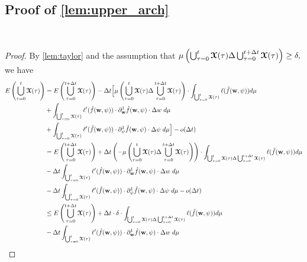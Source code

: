 \subsection{Proof of \cref{lem:upper_arch}}~\label{sec:upper_arch}
\begin{proof}
    By \cref{lem:taylor} and the assumption that $\mu\left( \bigcup_{\tau = 0}^{t}\boldsymbol{\mathcal{X}}(\tau)\Delta \bigcup_{\tau = 0}^{t+\Delta t}\boldsymbol{\mathcal{X}}(\tau)\right)\geq \delta,$ we have
    \begin{align*}
       E\left(\bigcup_{\tau = 0}^{t}\tx(\tau)\right) & = E\left(\bigcup_{\tau = 0}^{t+\Delta t}\tx(\tau)\right) - \Delta t\Big[\mu\left( \bigcup_{\tau = 0}^{t}\tx(\tau)\Delta \bigcup_{\tau = 0}^{t+\Delta t}\tx(\tau)\right)\cdot \displaystyle\int_{\bigcup_{\tau = 0}^{t}\tx(\tau)} \ell(\hat{f}(\weight,\psi))d\mu\\
        & +\displaystyle\int_{\bigcup_{\tau = 0}^{t}\tx(\tau)} \ell'(\hat{f}(\weight,\psi))\cdot \partial_{\weight}^1 \hat{f}(\weight,\psi)\cdot \Delta w \hspace{1mm}  d\mu\\
        & +\displaystyle\int_{\bigcup_{\tau = 0}^{t}\tx(\tau)} \ell'(\hat{f}(\weight,\psi))\cdot \partial_{\psi}^1 \hat{f}(\weight,\psi)\cdot \Delta \psi \hspace{1mm}  d\mu\Big]- o(\Delta t)\\
        & = E\left(\bigcup_{\tau = 0}^{t+\Delta t}\tx(\tau)\right) + \Delta t\left(-\mu\left( \bigcup_{\tau = 0}^{t}\tx(\tau)\Delta \bigcup_{\tau = 0}^{t+\Delta t}\tx(\tau)\right)\right)\cdot \displaystyle\int_{\bigcup_{\tau = 0}^{t}\tx(\tau)\Delta \bigcup_{\tau = 0}^{t+\Delta t}\tx(\tau)} \ell(\hat{f}(\weight,\psi))d\mu\\
        & - \Delta t\displaystyle\int_{\bigcup_{\tau = 0}^{t}\tx(\tau)} \ell'(\hat{f}(\weight,\psi))\cdot \partial_{\weight}^1 \hat{f}(\weight,\psi)\cdot \Delta w \hspace{1mm}  d\mu\\
        &-\Delta t \displaystyle\int_{\bigcup_{\tau = 0}^{t}\tx(\tau)} \ell'(\hat{f}(\weight,\psi))\cdot \partial_{\psi}^1 \hat{f}(\weight,\psi)\cdot \Delta \psi \hspace{1mm}  d\mu- o(\Delta t)\\
        & \leq E\left(\bigcup_{\tau = 0}^{t+\Delta t}\tx(\tau)\right) + \Delta t \cdot \delta \cdot \displaystyle\int_{\bigcup_{\tau = 0}^{t}\tx(\tau)\Delta \bigcup_{\tau = 0}^{t+\Delta t}\tx(\tau)} \ell(\hat{f}(\weight,\psi))d\mu\\
        & - \Delta t\displaystyle\int_{\bigcup_{\tau = 0}^{t}\tx(\tau)} \ell'(\hat{f}(\weight,\psi))\cdot \partial_{\weight}^1 \hat{f}(\weight,\psi)\cdot \Delta w \hspace{1mm}  d\mu\\

\end{align*}
\end{proof}
